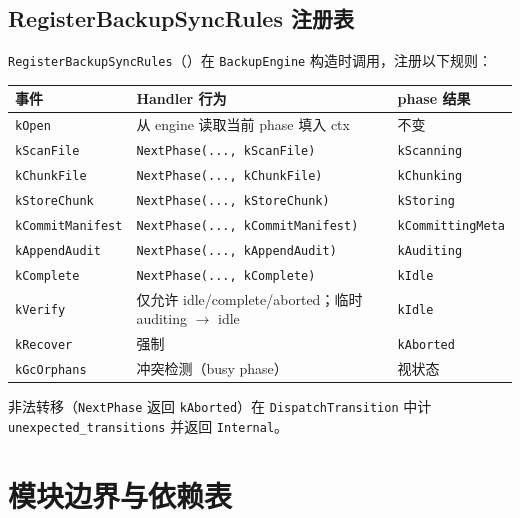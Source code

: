 \subsection{RegisterBackupSyncRules 注册表}

\texttt{RegisterBackupSyncRules}（）在 \texttt{BackupEngine} 构造时调用，注册以下规则：

\begin{longtable}{@{}llp{7cm}@{}}
\toprule
事件 & Handler 行为 & phase 结果 \\
\midrule
\texttt{kOpen} & 从 engine 读取当前 phase 填入 ctx & 不变 \\
\texttt{kScanFile} & \texttt{NextPhase(..., kScanFile)} & \texttt{kScanning} \\
\texttt{kChunkFile} & \texttt{NextPhase(..., kChunkFile)} & \texttt{kChunking} \\
\texttt{kStoreChunk} & \texttt{NextPhase(..., kStoreChunk)} & \texttt{kStoring} \\
\texttt{kCommitManifest} & \texttt{NextPhase(..., kCommitManifest)} & \texttt{kCommittingMeta} \\
\texttt{kAppendAudit} & \texttt{NextPhase(..., kAppendAudit)} & \texttt{kAuditing} \\
\texttt{kComplete} & \texttt{NextPhase(..., kComplete)} & \texttt{kIdle} \\
\texttt{kVerify} & 仅允许 idle/complete/aborted；临时 auditing $\rightarrow$ idle & \texttt{kIdle} \\
\texttt{kRecover} & 强制 & \texttt{kAborted} \\
\texttt{kGcOrphans} & 冲突检测（busy phase） & 视状态 \\
\bottomrule
\end{longtable}

非法转移（\texttt{NextPhase} 返回 \texttt{kAborted}）在 \texttt{DispatchTransition} 中计 \texttt{unexpected\_transitions} 并返回 \texttt{Internal}。

\section{模块边界与依赖表}

